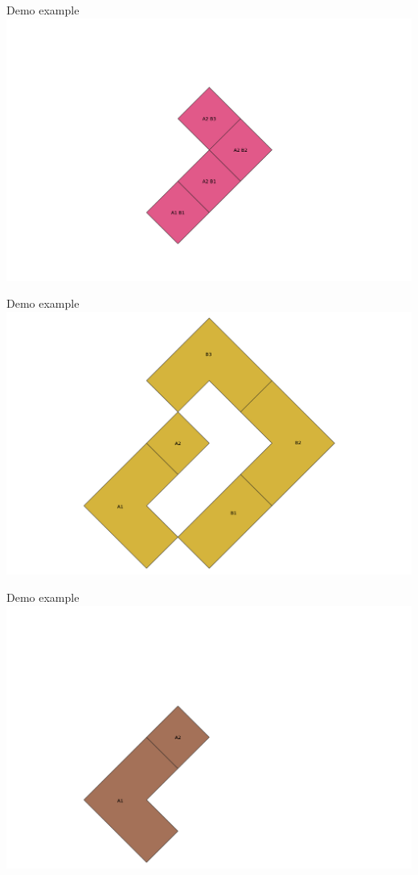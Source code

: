 \documentclass{beamer}
\begin{document}
\begin{frame}{Demo example}
    \centering 
    \includegraphics[width=\linewidth]{figures/Demo04} 
\end{frame}

\begin{frame}{Demo example}
    \centering 
    \includegraphics[width=\linewidth]{figures/Demo05} 
\end{frame}

\begin{frame}{Demo example}
    \centering 
    \includegraphics[width=\linewidth]{figures/Demo06} 
\end{frame}
\end{document}
